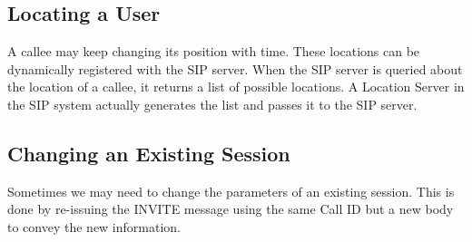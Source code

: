\documentclass[12pt]{Book}
\begin{document}
    \subsection{Locating a User}
    A callee may keep changing its position with time. These locations can be dynamically registered with
    the SIP server. When the SIP server is queried about the location of a callee, it returns a list of possible
    locations. A Location Server in the SIP system actually generates the list and passes it to the SIP server.
    \subsection{Changing an Existing Session}
    Sometimes we may need to change the parameters of an existing session. This is done by re-issuing the
    INVITE message using the same Call ID but a new body to convey the new information.
\end{document}
